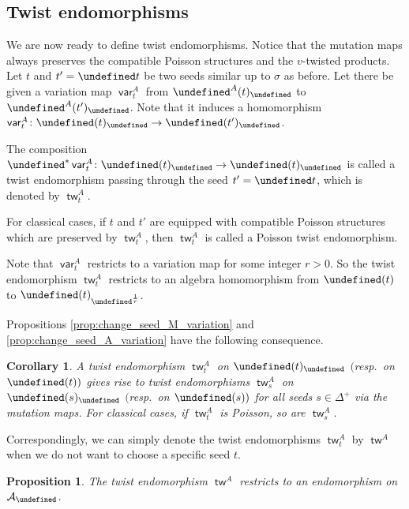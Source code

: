 \documentclass[10pt,a4paper]{amsart}
\newcommand{\Q}{\mathbb{Q}}
\renewcommand{\tilde}[1]{\widetilde{#1}}
\newcommand{\opname}[1]{\operatorname{\mathsf{#1}}}
\newcommand{\cA}{{\mathcal A}}
\newcommand{\clAlg}{{\cA}}%
\newcommand{\tw}{{\tilde{w}}}
\newcommand{\var}{\opname{var}}
\let\upClAlg\undefined
\let\LP\undefined
\let\fFac\undefined
\let\fFacRoot\undefined
\let\seq\undefined
\renewcommand{\tw}{\opname{tw}}
\newcommand{\upClAlg}{\mathcal{U}^A}
\newcommand{\LP}{{\mathcal{LP}}}
\newcommand{\fFac}{\mathcal{Z}}
\newcommand{\fFacRoot}{\fFac^{\Q}}
\newcommand{\seq}{\boldsymbol{\mu}}%
\renewcommand{\tw}{\opname{tw}}
\numberwithin{equation}{section}
\newtheorem{Corollary}[Theorem]{Corollary}
\newtheorem{Proposition}[Theorem]{Proposition}
 { \theoremstyle{definition}
\newtheorem{Definition}[Theorem]{Definition}
\newtheorem{Note}[Theorem]{Note}
\newtheorem{Example}[Theorem]{Example}
\newtheorem{Remark}[Theorem]{Remark}
\newtheorem{Assumption}[Theorem]{Assumption}
}
\begin{document}
\subsection{Twist endomorphisms}

We are now ready to define twist endomorphisms. Notice that the mutation
maps always preserves the compatible Poisson structures and the $v$-twisted products. Let $t$ and $t'=\seq t$ be two
seeds similar up to $\sigma$ as before. Let there be given a variation
map $\var_{t}^{A}$ from $\LP^{A}(t)_{\fFacRoot}$ to~$\LP^{A}(t')_{\fFacRoot}$.
Note that it induces a homomorphism $\var_{t}^{A}\colon\upClAlg(t)_{\fFacRoot}\rightarrow \upClAlg(t')_{\fFacRoot}$.

\begin{Definition}
The composition $\seq^{*}\var_{t}^{A}\colon\upClAlg(t)_{\fFacRoot}\rightarrow\upClAlg(t)_{\fFacRoot}$
is called a twist endomorphism passing through the seed $t'=\seq t$, which
is denoted by $\tw_{t}^{A}$.

For classical cases, if $t$ and $t'$ are equipped with compatible Poisson structures
which are preserved by $\tw_{t}^{A}$, then $\tw_{t}^{A}$ is called
a Poisson twist endomorphism.
\end{Definition}

Note that $\var_{t}^{A}$ restricts to a variation map \smash{$\var_{t}^{A}\colon\LP(t)\rightarrow\LP(t')_{\fFac^{\frac{1}{r}}}$}
for some integer $r>0$. So the twist endomorphism $\tw_{t}^{A}$
restricts to an algebra homomorphism from $\upClAlg(t)$ to $\upClAlg(t)_{\fFac^{\frac{1}{r}}}$.

Propositions \ref{prop:change_seed_M_variation} and \ref{prop:change_seed_A_variation}
have the following consequence.

\begin{Corollary}
A twist endomorphism $\tw_{t}^{A}$ on $\upClAlg(t)_{\fFacRoot}$ $($resp.\ on $\upClAlg(t))$ gives rise to twist endomorphisms $\tw_{s}^{A}$ on
$\upClAlg(s)_{\fFacRoot}$ $($resp.\ on $\upClAlg(s))$ for all seeds $s\in\Delta^{+}$
via the mutation maps. For classical cases, if $\tw_{t}^{A}$ is Poisson,
so are $\tw_{s}^{A}$.
\end{Corollary}

Correspondingly, we can simply denote the twist endomorphisms $\tw_{t}^{A}$
by $\tw^{A}$ when we do not want to choose a specific seed $t$.

\begin{Proposition}\label{prop:A_variation_map_restrict_cluster_alg}
The twist endomorphism $\tw^{A}$ restricts to an endomorphism
on $\clAlg_{\fFacRoot}$.
\end{Proposition}
\end{document}
